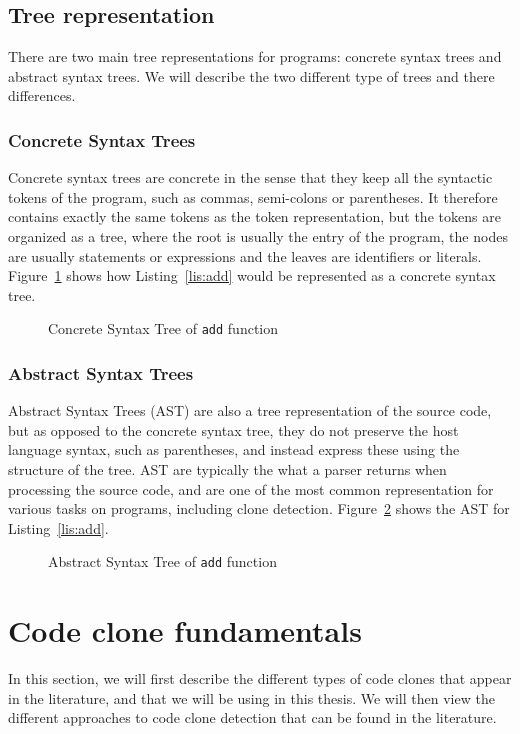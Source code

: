 \subsection{\label{ssec:tree-representation}Tree representation}
There are two main tree representations for programs: concrete syntax trees and
abstract syntax trees. We will describe the two different type of trees and
there differences.
\subsubsection{Concrete Syntax Trees}
Concrete syntax trees are concrete in the sense that they keep all the syntactic
tokens of the program, such as commas, semi-colons or parentheses. It therefore
contains exactly the same tokens as the token representation, but the tokens
are organized as a tree, where the root is usually the entry of the program,
the nodes are usually statements or expressions and the leaves are identifiers
or literals. Figure~\ref{fig:add-cst} shows how Listing~\ref{lis:add} would be
represented as a concrete syntax tree.
\begin{figure}[tb]
  \begin{center}
    \caption{\label{fig:add-cst}Concrete Syntax Tree of \lstinline{add} function}
  \end{center}
\end{figure}
\subsubsection{Abstract Syntax Trees}
Abstract Syntax Trees (AST) are also a tree representation of the source code,
but as opposed to the concrete syntax tree, they do not preserve the host
language syntax, such as parentheses, and instead express these using the
structure of the tree.
AST are typically the what a parser returns when processing the source code, and
are one of the most common representation for various tasks on programs,
including clone detection.
Figure~\ref{fig:add-ast} shows the AST for Listing~\ref{lis:add}.
\begin{figure}[tb]
  \begin{center}
    \caption{\label{fig:add-ast}Abstract Syntax Tree of \lstinline{add} function}
  \end{center}
\end{figure}
\section{Code clone fundamentals}
In this section, we will first describe the different types of code clones
that appear in the literature, and that we will be using in this thesis.
We will then view the different approaches to code clone detection that can be
found in the literature.
